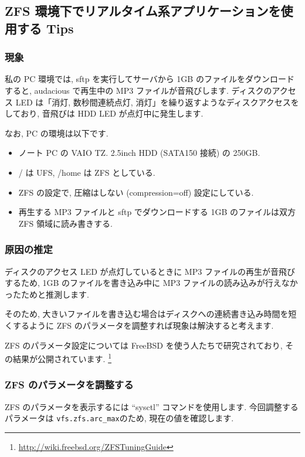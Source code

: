 \documentclass[mingoth,a4paper]{jsarticle}
\begin{document}
\subsection{ZFS 環境下でリアルタイム系アプリケーションを使用する Tips}
\subsubsection{現象}
私の PC 環境では, sftp を実行してサーバから 1GB のファイルをダウンロードすると, audacious で再生中の MP3 ファイルが音飛びします. ディスクのアクセス LED は「消灯, 数秒間連続点灯, 消灯」を繰り返すようなディスクアクセスをしており, 音飛びは HDD LED が点灯中に発生します.

なお, PC の環境は以下です.

\begin{itemize}
  \item ノート PC の VAIO TZ. 2.5inch HDD (SATA150 接続) の 250GB.
  \item / は UFS, /home は ZFS としている.
  \item ZFS の設定で, 圧縮はしない (compression=off) 設定にしている.
  \item 再生する MP3 ファイルと sftp でダウンロードする 1GB のファイルは双方 ZFS 領域に読み書きする.
\end{itemize}

\subsubsection{原因の推定}
ディスクのアクセス LED が点灯しているときに MP3 ファイルの再生が音飛びするため, 1GB のファイルを書き込み中に MP3 ファイルの読み込みが行えなかったためと推測します.

そのため, 大きいファイルを書き込む場合はディスクへの連続書き込み時間を短くするように ZFS のパラメータを調整すれば現象は解決すると考えます.

ZFS のパラメータ設定については FreeBSD を使う人たちで研究されており, その結果が公開されています. \footnote{\url{http://wiki.freebsd.org/ZFSTuningGuide}}

\subsubsection{ZFS のパラメータを調整する}
ZFS のパラメータを表示するには ``sysctl'' コマンドを使用します.
今回調整するパラメータは \verb!vfs.zfs.arc_max!のため, 現在の値を確認します.

\end{document}
